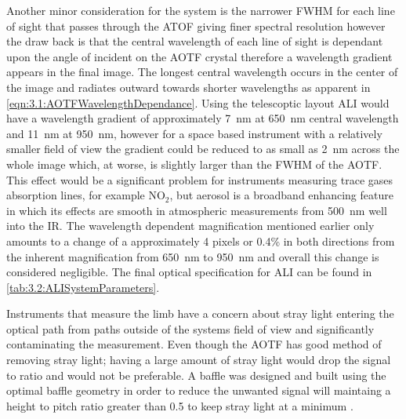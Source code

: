 \documentclass[12pt]{article}
\begin{document}
Another minor consideration for the system is the narrower FWHM for each line of sight that passes through the ATOF giving finer spectral resolution however the draw back is that the central wavelength of each line of sight is dependant upon the angle of incident on the AOTF crystal therefore a wavelength gradient appears in the final image. The longest central wavelength occurs in the center of the image and radiates outward towards shorter wavelengths as apparent in \autoref{eqn:3.1:AOTFWavelengthDependance}. Using the telescoptic layout ALI would have a wavelength gradient of approximately 7~nm at 650~nm central wavelength and 11~nm at 950~nm, however for a space based instrument with a relatively smaller field of view the gradient could be reduced to as small as 2~nm across the whole image which, at worse, is slightly larger than the FWHM of the AOTF. This effect would be a significant problem for instruments measuring trace gases absorption lines, for example NO$_{2}$, but aerosol is a broadband enhancing feature in which its effects are smooth in atmospheric measurements from 500~nm well into the IR. The wavelength dependent magnification mentioned earlier only amounts to a change of a approximately 4 pixels or 0.4\% in both directions from the inherent magnification from 650~nm to 950~nm and overall this change is considered negligible. The final optical specification for ALI can be found in \autoref{tab:3.2:ALISystemParameters}.

Instruments that measure the limb have a concern about stray light entering the optical path from paths outside of the systems field of view and significantly contaminating the measurement. Even though the AOTF has good method of removing stray light; having a large amount of stray light would drop the signal to ratio and would not be preferable. A baffle was designed and built using the optimal baffle geometry in order to reduce the unwanted signal will maintaing a height to pitch ratio greater than 0.5 to keep stray light at a minimum \citep{Fischer2008}.

\end{document}
